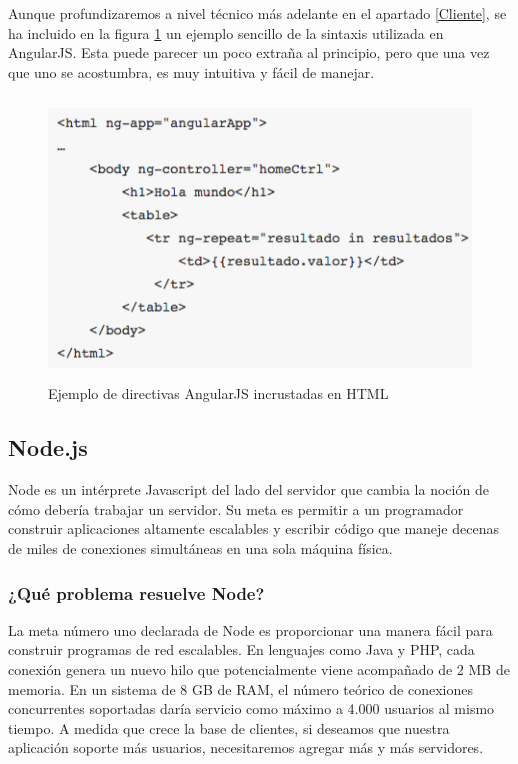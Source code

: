Aunque profundizaremos a nivel técnico más adelante en el apartado \ref{Cliente}, se ha incluido en la figura \ref{ejemploAngular} un ejemplo sencillo de la sintaxis utilizada en AngularJS. Esta puede parecer un poco extraña al principio, pero que una vez que uno se acostumbra, es muy intuitiva y fácil de manejar.

\begin{figure}[h] \centering
	\includegraphics[height=7.5cm]{graphs/angular_example.png} \caption{Ejemplo de directivas AngularJS incrustadas en HTML \cite{penflip}}
	\label{ejemploAngular}
\end{figure}

\subsection{Node.js}
Node es un intérprete Javascript del lado del servidor que cambia la noción de cómo debería trabajar un servidor. Su meta es permitir a un programador construir aplicaciones altamente escalables y escribir código que maneje decenas de miles de conexiones simultáneas en una sola máquina física.

\subsubsection{¿Qué problema resuelve Node?}
La meta número uno declarada de Node es proporcionar una manera fácil para construir programas de red escalables. En lenguajes como Java y PHP, cada conexión genera un nuevo hilo que potencialmente viene acompañado de 2 MB de memoria. En un sistema de 8 GB de \ac{RAM}, el número teórico de conexiones concurrentes soportadas daría servicio como máximo a 4.000 usuarios al mismo tiempo. A medida que crece la base de clientes, si deseamos que nuestra aplicación soporte más usuarios, necesitaremos agregar más y más servidores.

